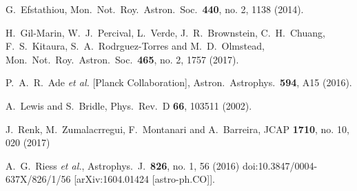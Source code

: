 \documentclass[aps,prd,nofootinbib,amsmath,amssymb,twocolumn,superscriptaddress,10pt]{revtex4}%
\begin{document}
\begin{thebibliography}{}
  G.~Efstathiou,
  Mon.\ Not.\ Roy.\ Astron.\ Soc.\  {\bf 440}, no. 2, 1138 (2014).



  H.~Gil-Marin, W.~J.~Percival, L.~Verde, J.~R.~Brownstein, C.~H.~Chuang, F.~S.~Kitaura, S.~A.~Rodrguez-Torres and M.~D.~Olmstead,
  Mon.\ Not.\ Roy.\ Astron.\ Soc.\  {\bf 465}, no. 2, 1757 (2017).


  P.~A.~R.~Ade {\it et al.} [Planck Collaboration],
  Astron.\ Astrophys.\  {\bf 594}, A15 (2016).


  A.~Lewis and S.~Bridle,
  Phys.\ Rev.\ D {\bf 66}, 103511 (2002).

  J.~Renk, M.~Zumalacrregui, F.~Montanari and A.~Barreira,
  JCAP {\bf 1710}, no. 10, 020 (2017)


  A.~G.~Riess {\it et al.},
  Astrophys.\ J.\  {\bf 826}, no. 1, 56 (2016)
  doi:10.3847/0004-637X/826/1/56
  [arXiv:1604.01424 [astro-ph.CO]].


\end{thebibliography}{}
\end{document}
